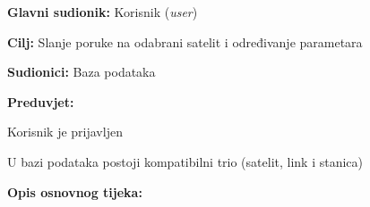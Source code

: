 				\noindent {}
				\begin{packed_item}
					
					\item \textbf{Glavni sudionik: }Korisnik (\textit{user})
					\item  \textbf{Cilj: }Slanje poruke na odabrani satelit i određivanje parametara
					\item  \textbf{Sudionici: }Baza podataka
					\item  \textbf{Preduvjet: }
					\begin{packed_enum}
					\item Korisnik je prijavljen \item U bazi podataka postoji kompatibilni trio (satelit, link i stanica)	\end{packed_enum}
					\item  \textbf{Opis osnovnog tijeka: }
					
					\item[] \begin{packed_enum}
						

\end{packed_enum}
\end{packed_item}
